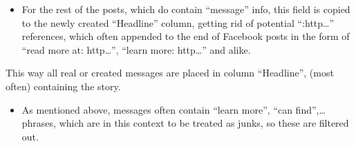 \documentclass[]{article}
\newenvironment{Shaded}{\begin{snugshade}}{\end{snugshade}}
\newcommand{\KeywordTok}[1]{\textcolor[rgb]{0.13,0.29,0.53}{\textbf{{#1}}}}
\newcommand{\DataTypeTok}[1]{\textcolor[rgb]{0.13,0.29,0.53}{{#1}}}
\newcommand{\CharTok}[1]{\textcolor[rgb]{0.31,0.60,0.02}{{#1}}}
\newcommand{\StringTok}[1]{\textcolor[rgb]{0.31,0.60,0.02}{{#1}}}
\newcommand{\CommentTok}[1]{\textcolor[rgb]{0.56,0.35,0.01}{\textit{{#1}}}}
\newcommand{\NormalTok}[1]{{#1}}
\providecommand{\tightlist}{%
  \setlength{\itemsep}{0pt}\setlength{\parskip}{0pt}}
\begin{document}
\begin{itemize}
\tightlist
\item
  For the rest of the posts, which do contain ``message'' info, this
  field is copied to the newly created ``Headline'' column, getting rid
  of potential ``:http\ldots{}'' references, which often appended to the
  end of Facebook posts in the form of ``read more at: http\ldots{}'',
  ``learn more: http\ldots{}'' and alike.
\end{itemize}

\begin{Shaded}
\end{Shaded}

This way all real or created messages are placed in column ``Headline'',
(most often) containing the story.

\begin{itemize}
\tightlist
\item
  As mentioned above, messages often contain ``learn more'', ``can
  find'',\ldots{} phrases, which are in this context to be treated as
  junks, so these are filtered out.
\end{itemize}

\begin{Shaded}
\end{Shaded}
\end{document}
